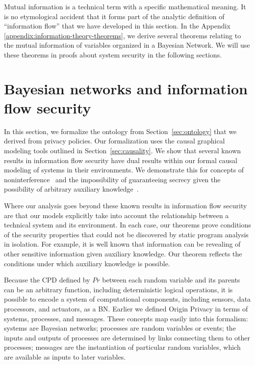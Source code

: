 \documentclass[../thesis.tex]{subfiles}
\begin{document}
Mutual information is a technical term with a specific mathematical
meaning.
It is no etymological accident that it forms part of the analytic
definition of ``information flow'' that we have developed in this
section.
In the Appendix \ref{appendix:information-theory-theorems},
we derive several theorems relating to
the mutual information of variables organized in a Bayesian
Network.
We will use these theorems in proofs about system security
in the following sections.

\section{Bayesian networks and information flow security}
\label{sec:security}

In this section, we formalize the ontology from
Section~\ref{sec:ontology} that we derived from
privacy policies.
Our formalization uses the causal graphical modeling
tools outlined in Section~\ref{sec:causality}.
We show that several known results in information flow
security have dual results within our formal causal modeling
of systems in their environments.
We demonstrate this for concepts of 
noninterference~\cite{gm82security} and the impossibility
of guaranteeing secrecy given the possibility of
arbitrary auxiliary knowledge~\cite{dwork06icalp,dwork08jpc}.

Where our analysis goes beyond these known results
in information flow security are that our models
explicitly take into account the relationship between
a technical system and its environment.
In each case, our theorems prove conditions of the
security properties that could not be discovered
by static program analysis in isolation.
For example, it is well known that information
can be revealing of other sensitive information given
auxiliary knowledge. Our theorem reflects the conditions
under which auxiliary knowledge is possible.

Because the CPD defined by \(Pr\) between each random
variable and its
parents can be an arbitrary function, including deterministic
logical operations, it is possible to encode a system of
computational components, including sensors, data processors,
and actuators, as a BN.
Earlier we defined Origin Privacy in terms of systems, processes,
and messages.
These concepts map easily into this formalism: systems are
Bayesian networks; processes are random variables or events;
the inputs and outputs of processes are determined by links
connecting them to other processes; messages are
the instantiation 
of particular random variables,
which are available as inputs to
later variables.
\end{document}
